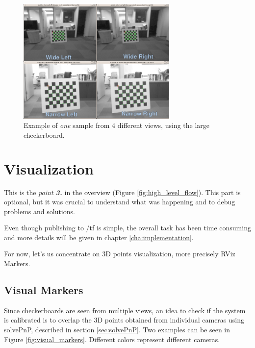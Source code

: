 \begin{figure}[!htbp]
 \centering
 \includegraphics[width=0.7\textwidth]{images/data_collection01.png}
 \caption{Example of \textit{one} sample from 4 different views, using the large checkerboard.}
 \label{fig:data_collection01}
\end{figure}




\section{Visualization}
\label{sec:visualization}

This is the \textit{point \textbf{3.}} in the overview (Figure \ref{fig:high_level_flow}). This part is optional, but it was crucial to understand what was happening and to debug problems and solutions.

Even though publishing to /tf is simple, the overall task has been time consuming and more details will be given in chapter \ref{cha:implementation}. %

For now, let's us concentrate on 3D points visualization, more precisely RViz Markers.

\subsection{Visual Markers}
\label{sec:visual_markers}

Since checkerboards are seen from multiple views, an idea to check if the system is calibrated is to overlap the 3D points obtained from individual cameras using solvePnP, described in section \ref{sec:solvePnP}. Two examples can be seen in Figure \ref{fig:visual_markers}. Different colors represent different cameras.

